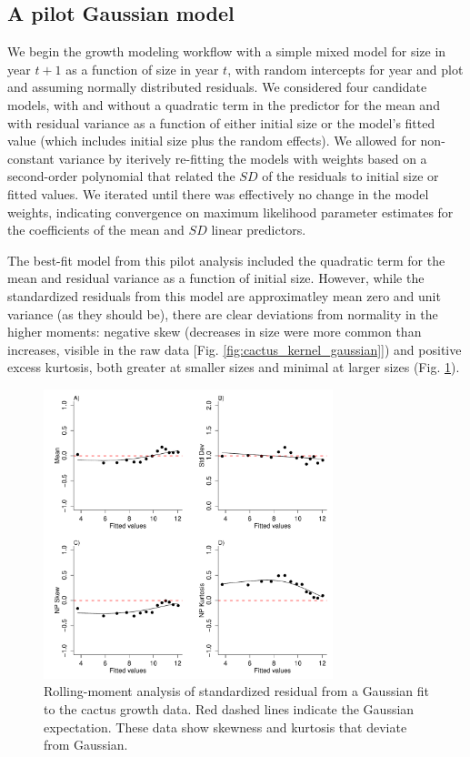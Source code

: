 \documentclass[12pt]{article}
\begin{document}
\subsection{A pilot Gaussian model}
We begin the growth modeling workflow with a simple mixed model for size in year $t+1$ as a function of size in year $t$, with random intercepts for year and plot and assuming normally distributed residuals. 
We considered four candidate models, with and without a quadratic term in the predictor for the mean and with residual variance as a function of either initial size or the model's fitted value (which includes initial size plus the random effects).
We allowed for non-constant variance by iterively re-fitting the models with weights based on a second-order polynomial that related the $SD$ of the residuals to initial size or fitted values. 
We iterated until there was effectively no change in the model weights, indicating convergence on maximum likelihood parameter estimates for the coefficients of the mean and $SD$ linear predictors. 

The best-fit model from this pilot analysis included the quadratic term for the mean and residual variance as a function of initial size. 
However, while the standardized residuals from this model are approximatley mean zero and unit variance (as they should be), there are clear deviations from normality in the higher moments: negative skew (decreases in size were more common than increases, visible in the raw data [Fig. \ref{fig:cactus_kernel_gaussian}]) and positive excess kurtosis, both greater at smaller sizes and minimal at larger sizes (Fig. \ref{fig:cactus_rolling_moments}). 

\begin{figure}
\centering
\includegraphics[width=0.75\textwidth]{figures/cactus_rolling_moments}
\caption{Rolling-moment analysis of standardized residual from a Gaussian fit to the cactus growth data. Red dashed lines indicate the Gaussian expectation. These data show skewness and kurtosis that deviate from Gaussian.}
\label{fig:cactus_rolling_moments}
\end{figure} 
\end{document}
